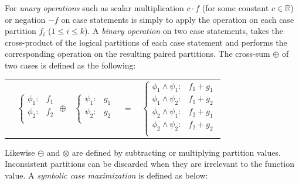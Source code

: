 \documentclass{article} %
\begin{document}
For \emph{unary operations} such as scalar multiplication $c\cdot f$ (for some constant $c \in \mathbb{R}$) or negation $-f$ on case statements is simply to apply the operation on each case partition $f_i$ ($1 \leq i \leq k$). 
A \emph{binary operation} on two case statements, takes the cross-product of the logical partitions of each case statement and performs the corresponding operation on the resulting paired partitions.  The cross-sum $\oplus$ of two cases is defined as the following:
{\footnotesize 
\vspace{-3mm}
\begin{center}
\begin{tabular}{r c c c l}
&
\hspace{-6mm} 
  $\begin{cases}
    \phi_1: & f_1 \\ 
    \phi_2: & f_2 \\ 
  \end{cases}$
$\oplus$
&
\hspace{-4mm}
  $\begin{cases}
    \psi_1: & g_1 \\ 
    \psi_2: & g_2 \\ 
  \end{cases}$
&
\hspace{-2mm} 
$ = $
&
\hspace{-2mm}
  $\begin{cases}
  \phi_1 \wedge \psi_1: & f_1 + g_1 \\ 
  \phi_1 \wedge \psi_2: & f_1 + g_2 \\ 
  \phi_2 \wedge \psi_1: & f_2 + g_1 \\ 
  \phi_2 \wedge \psi_2: & f_2 + g_2 \\ 
  \end{cases}$
\end{tabular}
\end{center}
\vspace{-2mm}
}
Likewise $\ominus$ and $\otimes$ are defined by subtracting or multiplying partition values.  Inconsistent partitions can be discarded when they are irrelevant to the function value.
A \emph{symbolic case maximization} is defined as below:
\vspace{-4mm}
\end{document}
